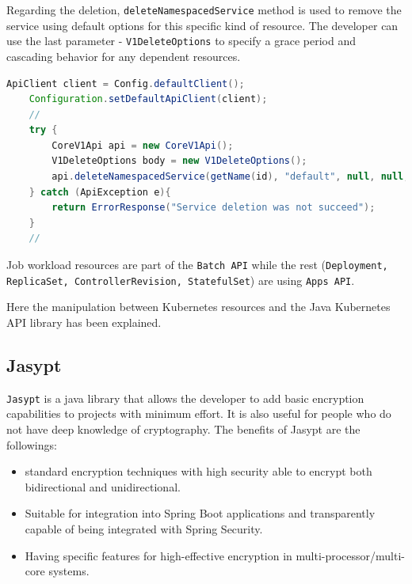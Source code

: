 Regarding the deletion, \texttt{deleteNamespacedService} method is used to remove the service using default options for this specific kind of resource. The developer can use the last parameter - \texttt{V1DeleteOptions} to specify a grace period and cascading behavior for any dependent resources.
\begin{lstlisting}[language={Java}]
    ApiClient client = Config.defaultClient();
    Configuration.setDefaultApiClient(client);
    //
    try {
        CoreV1Api api = new CoreV1Api();
        V1DeleteOptions body = new V1DeleteOptions();
        api.deleteNamespacedService(getName(id), "default", null, null, 56, true, null, body);
    } catch (ApiException e){
        return ErrorResponse("Service deletion was not succeed");
    }
    //  
\end{lstlisting}

Job workload resources are part of the \texttt{Batch API} while the rest (\texttt{Deployment, ReplicaSet, ControllerRevision, StatefulSet}) are using \texttt{Apps API}.

Here the manipulation between Kubernetes resources and the Java Kubernetes API library has been explained.

\subsection{Jasypt}
\label{subsec:jasypt}

\texttt{Jasypt} is a java library that allows the developer to add basic encryption capabilities to projects with minimum effort. It is also useful for people who do not have deep knowledge of cryptography. The benefits of Jasypt are the followings:
\begin{itemize}
    \item standard encryption techniques with high security able to encrypt both bidirectional and unidirectional.
    \item Suitable for integration into Spring Boot applications and transparently capable of being integrated with Spring Security.
    \item Having specific features for high-effective encryption in multi-processor/multi-core systems.
\end{itemize}

